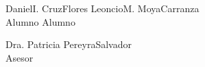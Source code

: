 \documentclass[a4paper, 12pt]{article}
\begin{document}
    

\vspace{5.0cm}
\vspace{5.0cm}
\vskip 0.3cm



\vskip 1cm
\vskip 1cm
\vskip 1cm



\hspace{0.7cm}Daniel\hspace{.1cm}I.\hspace{.1cm} Cruz\hspace{.1cm}Flores 
\hspace{4cm}Leoncio\hspace{.1cm}M.\hspace{.1cm} Moya\hspace{.1cm}Carranza \\
\hspace*{2.6cm} Alumno  \hspace*{6.6cm}Alumno


\vskip 1cm
\begin{center}
Dra. \hspace{.1cm}Patricia\hspace{.1cm} Pereyra\hspace{.1cm}Salvador\\
 Asesor
\end{center}
\end{document}
